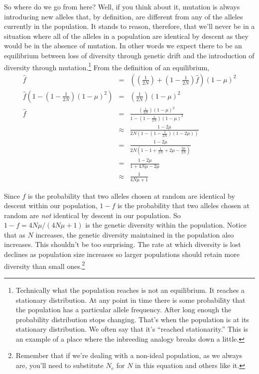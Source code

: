 \documentclass[12pt]{article}
\begin{document}
So where do we go from here? Well, if you think about it, mutation is
always introducing new alleles that, by definition, are different from
any of the alleles currently in the population. It stands to reason,
therefore, that we'll never be in a situation where all of the alleles
in a population are identical by descent as they would be in the
absence of mutation. In other words we expect there to be an
equilibrium between loss of diversity through genetic drift and the
introduction of diversity through mutation.\footnote{Technically what
  the population reaches is not an equilibrium. It reaches a
  stationary distribution. At any point in time there is some
  probability that the population has a particular allele
  frequency. After long enough the probability distribution stops
  changing. That's when the population is at its stationary
  distribution. We often say that it's ``reached stationarity.'' This
  is an example of a place where the inbreeding analogy breaks down a
  little.} From the
definition of an equilibrium,
\begin{eqnarray*}
\hat f &=& \left(\left(\frac{1}{2N}\right) +
          \left(1 - \frac{1}{2N}\right)\hat f\right)(1-\mu)^2 \\
\hat f\left(1 -
\left(1 - \frac{1}{2N}\right)(1-\mu)^2\right)
       &=& \left(\frac{1}{2N}\right)(1-\mu)^2 \\
\hat f &=& \frac{\left(\frac{1}{2N}\right)(1-\mu)^2}
           {1 -\left(1 - \frac{1}{2N}\right)(1-\mu)^2} \\
       &\approx& \frac{1 - 2\mu}
           {2N\left(1 - \left(1 - \frac{1}{2N}\right)(1-2\mu)\right)} \\
       &=& \frac{1 - 2\mu}
           {2N\left(1 - 1 + \frac{1}{2N} + 2\mu -
            \frac{2\mu}{2N}\right)} \\
       &=& \frac{1 - 2\mu}{1 + 4N\mu - 2\mu} \\
       &\approx& \frac{1}{4N\mu + 1}
\end{eqnarray*}

Since $f$ is the probability that two alleles chosen at random are
identical by descent within our population, $1-f$ is the probability
that two alleles chosen at random are {\it not\/} identical by descent
in our population. So $1-f = 4N\mu/(4N\mu + 1)$ is the genetic
diversity within the population. Notice that as $N$ increases, the
genetic diversity maintained in the population also increases. This
shouldn't be too surprising. The rate at which diversity is lost
declines as population size increases so larger populations should
retain more diversity than small ones.\footnote{Remember that if we're
  dealing with a non-ideal population, as we always are, you'll need
  to substitute $N_e$ for $N$ in this equation and others like it.}
\end{document}
